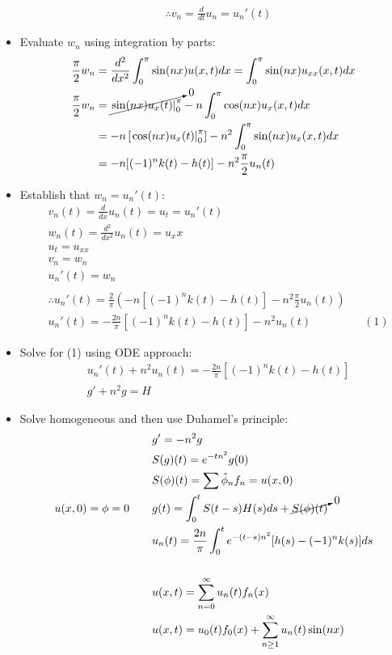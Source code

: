 \documentclass[12pt, a4paper]{article}
\begin{document}
\begin{itemize}
\begin{align*}
        &\therefore v_n = \frac{d}{dt}u_n = u_n'(t)
    \end{align*}
    \item Evaluate $w_n$ using integration by parts:
    \begin{align*}
        \frac{\pi}{2}w_n &=\frac{d^2}{dx^2}\int_0^\pi\sin(nx)u(x, t)dx=\int_0^\pi \sin(nx)u_{xx}(x, t)dx\\
        \frac{\pi}{2}w_n &=\cancelto{0}{\left.\sin(nx)u_x(t)\right\rvert_0^\pi} - n\int_0^\pi \cos(nx)u_x(x, t)dx\\
        &=-n\left[\left.\cos(nx)u_x(t)\right\rvert_0^\pi\right]-n^2\int_0^\pi \sin(nx)u_x(x, t)dx\\
        &=-n[(-1)^nk(t)-h(t)]-n^2\frac{\pi}{2}u_n(t)\\
    \end{align*}
    \item Establish that $w_n = u_n'(t)$:
    \begin{align*}
        &v_n(t) = \frac{d}{dx}u_n(t) = u_t = u_n'(t)\\
        &w_n(t) = \frac{d^2}{dx^2}u_n(t) = u_xx\\
        &u_t = u_{xx}\\
        &v_n = w_n\\
        &u_n'(t)= w_n\\\\
        &\therefore u_n'(t)=\frac{2}{\pi}\left(-n[(-1)^nk(t)-h(t)]-n^2\frac{\pi}{2}u_n(t)\right) \\
        &u_n'(t)=-\frac{2n}{\pi}[(-1)^nk(t)-h(t)]-n^2u_n(t) && (1)
    \end{align*}
    \item Solve for (1) using ODE approach:
    \begin{align*}
        &u_n'(t)+n^2u_n(t)=-\frac{2n}{\pi}[(-1)^nk(t)-h(t)]\\
        &g' +n^2g = H    
    \end{align*}
    \item Solve homogeneous and then use Duhamel's principle:
    \begin{align*}
        &g' = -n^2g\\
        &S(g)(t) = e^{-tn^2}g(0)\\
        &S(\phi)(t) = \sum\hat{\phi}_nf_n = u(x, 0)\\
        u(x, 0) = \phi = 0 \qquad &g(t) = \int_0^t S(t-s)H(s)ds + \cancelto{0}{S(\phi)(t)}\\
        &u_n(t) = \frac{2n}{\pi} \int_0^t e^{-(t-s)n^2}[h(s) - (-1)^nk(s)]ds\\\\
        &u(x, t) = \sum_{n=0}^{\infty}u_n(t)f_n(x)\\
        &u(x, t) = u_0(t)f_0(x) + \sum_{n\geq 1}^{\infty}u_n(t)\sin(nx)
    \end{align*}
\end{itemize}
\vspace{0.3em}
\end{document}
